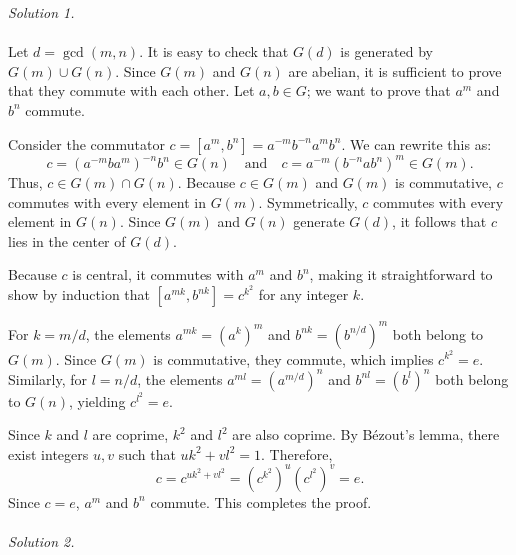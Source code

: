 \begin{solution}
    \textit{Solution 1.}
    \\\\
    Let \( d = \gcd\left(m,n\right) \). It is easy to check that \( G\left(d\right) \) is generated by \( G\left(m\right) \cup G\left(n\right) \). Since \( G\left(m\right) \) and \( G\left(n\right) \) are abelian, it is sufficient to prove that they commute with each other. Let \( a,b \in G \); we want to prove that \( a^m \) and \( b^n \) commute.

    Consider the commutator \( c = \left[a^m, b^n\right] = a^{-m}b^{-n}a^m b^n \). We can rewrite this as:
    \[
        c = \left(a^{-m} b a^m\right)^{-n} b^n \in G\left(n\right) \quad \text{and} \quad c = a^{-m} \left(b^{-n} a b^n\right)^m \in G\left(m\right).
    \]
    Thus, \( c \in G\left(m\right) \cap G\left(n\right) \). Because \( c \in G\left(m\right) \) and \( G\left(m\right) \) is commutative, \( c \) commutes with every element in \( G\left(m\right) \). Symmetrically, \( c \) commutes with every element in \( G\left(n\right) \). Since \( G\left(m\right) \) and \( G\left(n\right) \) generate \( G\left(d\right) \), it follows that \( c \) lies in the center of \( G\left(d\right) \).

    Because \( c \) is central, it commutes with \( a^m \) and \( b^n \), making it straightforward to show by induction that \( \left[a^{mk}, b^{nk}\right] = c^{k^2} \) for any integer \( k \).

    For \( k = m/d \), the elements \( a^{mk} = \left(a^k\right)^m \) and \( b^{nk} = \left(b^{n/d}\right)^m \) both belong to \( G\left(m\right) \). Since \( G\left(m\right) \) is commutative, they commute, which implies \( c^{k^2} = e \). Similarly, for \( l = n/d \), the elements \( a^{ml} = \left(a^{m/d}\right)^n \) and \( b^{nl} = \left(b^l\right)^n \) both belong to \( G\left(n\right) \), yielding \( c^{l^2} = e \).

    Since \( k \) and \( l \) are coprime, \( k^2 \) and \( l^2 \) are also coprime. By Bézout's lemma, there exist integers \( u, v \) such that \( u k^2 + v l^2 = 1 \). Therefore,
    \[
        c = c^{u k^2 + v l^2} = \left(c^{k^2}\right)^u \left(c^{l^2}\right)^v = e.
    \]
    Since \( c = e \), \( a^m \) and \( b^n \) commute. This completes the proof.
    \\\\
    \textit{Solution 2.}
    \\\\


\end{solution}

